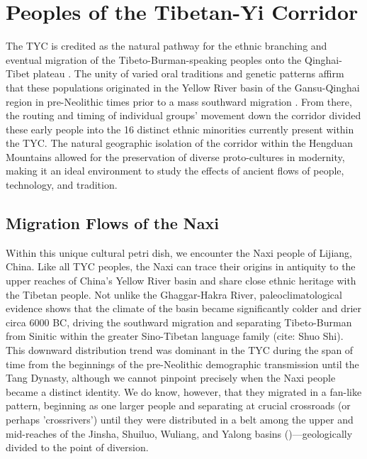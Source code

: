 \documentclass[11pt,a4paper,oneside]{report}
\begin{document}
\section{Peoples of the Tibetan-Yi Corridor}
\noindent\hspace{1cm}
The TYC is credited as the natural pathway for the ethnic branching and eventual migration of the Tibeto-Burman-speaking peoples onto the Qinghai-Tibet plateau \cite{yao_genetic_2017}. The unity of varied oral traditions and genetic patterns affirm that these populations originated in the Yellow River basin of the Gansu-Qinghai region in pre-Neolithic times prior to a mass southward migration \cite{shi_ethnic_2018}. From there, the routing and timing of individual groups' movement down the corridor divided these early people into the 16 distinct ethnic minorities currently present within the TYC. The natural geographic isolation of the corridor within the Hengduan Mountains allowed for the preservation of diverse proto-cultures in modernity, making it an ideal environment to study the effects of ancient flows of people, technology, and tradition.

\subsection{Migration Flows of the Naxi}
\noindent\hspace{1cm}
Within this unique cultural petri dish, we encounter the Naxi people of Lijiang, China. Like all TYC peoples, the Naxi can trace their origins in antiquity to the upper reaches of China's Yellow River basin and share close ethnic heritage with the Tibetan people\cite{yang_study_2024, he_gao_2017}. Not unlike the Ghaggar-Hakra River, paleoclimatological evidence shows that the climate of the basin became significantly colder and drier circa 6000 BC, driving the southward migration and separating Tibeto-Burman from Sinitic within the greater Sino-Tibetan language family (cite: Shuo Shi). This downward distribution trend was dominant in the TYC during the span of time from the beginnings of the pre-Neolithic demographic transmission until the Tang Dynasty, although we cannot pinpoint precisely when the Naxi people became a distinct identity. We do know, however, that they migrated in a fan-like pattern, beginning as one larger people and separating at crucial crossroads (or perhaps 'crossrivers') until they were distributed in a belt among the upper and mid-reaches of the Jinsha, Shuiluo, Wuliang, and Yalong basins (\cite{yang_study_2024})—geologically divided to the point of diversion.
\end{document}
